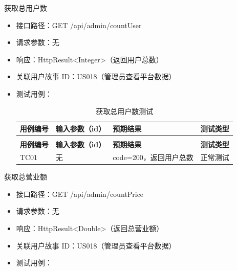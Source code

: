 \begin{levellist}
\begin{levellist}
        \item 获取总用户数
        \begin{itemize}
            \item 接口路径：GET /api/admin/countUser
            \item 请求参数：无
            \item 响应：HttpResult<Integer>（返回用户总数）
            \item 关联用户故事 ID：US018（管理员查看平台数据）
            \item 测试用例：
                  \begin{longtable}{>{\centering\arraybackslash}m{2cm} >{\centering\arraybackslash}m{4cm} >{\centering\arraybackslash}m{5cm} >{\centering\arraybackslash}m{2cm}}

                      \caption{获取总用户数测试} \label{tab:training}                             \\

                      \toprule
                      \textbf{用例编号} & \textbf{输入参数（id）} & \textbf{预期结果}   & \textbf{测试类型} \\
                      \midrule
                      \endfirsthead

                      \multicolumn{4}{c}{{\tablename\ \thetable{} 续表}}                    \\
                      \toprule
                      \textbf{用例编号} & \textbf{输入参数（id）} & \textbf{预期结果}   & \textbf{测试类型} \\
                      \midrule
                      \endhead

                      \bottomrule
                      \endfoot


                      TC01          & 无                 & code=200，返回用户总数 & 正常测试          \\
                  \end{longtable}
        \end{itemize}

        \item 获取总营业额
        \begin{itemize}
            \item 接口路径：GET /api/admin/countPrice
            \item 请求参数：无
            \item 响应：HttpResult<Double>（返回总营业额）
            \item 关联用户故事 ID：US018（管理员查看平台数据）
            \item 测试用例：
                  \begin{longtable}{>{\centering\arraybackslash}m{2cm} >{\centering\arraybackslash}m{4cm} >{\centering\arraybackslash}m{5cm} >{\centering\arraybackslash}m{2cm}}


\end{longtable}
\end{itemize}
\end{levellist}
\end{levellist}
